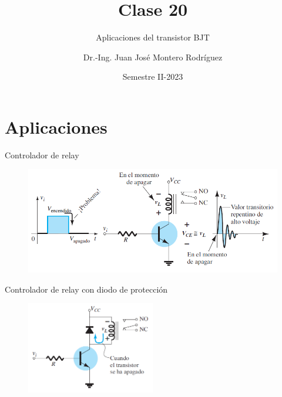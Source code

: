 \documentclass[t,aspectratio=169]{beamer}
\title{Clase 20}
\subtitle{Aplicaciones del transistor BJT}
\author{Dr.-Ing. Juan José Montero Rodríguez}
\institute{Escuela de Ingeniería Electrónica}
\date{Semestre II-2023}
\begin{document}
\begin{frame}{}
\maketitle
\end{frame}

\section{Aplicaciones}
\begin{frame}{Controlador de relay}

\begin{figure}[H]
    \centering
    \includegraphics[width=\textwidth]{figuras/aplicaciones_1.png}
\end{figure}

\end{frame}


\begin{frame}{Controlador de relay con diodo de protección}

\begin{figure}[H]
    \centering
    \includegraphics[width=0.5\textwidth]{figuras/aplicaciones_2.png}
\end{figure}

\end{frame}
\end{document}
